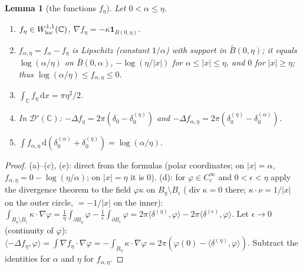 \documentclass[11pt]{article}
\newtheorem{lemma}[theorem]{Lemma}
\theoremstyle{definition}
\theoremstyle{remark}
\newcommand{\C}{\mathbb C}
\newcommand{\dd}{\,\mathrm d}
\DeclareMathOperator{\Div}{div}
\begin{document}
\begin{lemma}[the functions $f_\eta$]\label{lem:f}
Let $0<\alpha\le\eta$.
\begin{enumerate}[label=(\alph*)]
\item $f_\eta\in W^{1,1}_{\rm loc}(\C)$, $\nabla f_\eta=-\kappa\mathbf 1_{B(0,\eta)}$.
\item $f_{\alpha,\eta}=f_\alpha-f_\eta$ is Lipschitz (constant $1/\alpha$) with support in $\bar B(0,\eta)$; it equals
$\log(\alpha/\eta)$ on $\bar B(0,\alpha)$, $-\log(\eta/|x|)$ for $\alpha\le|x|\le\eta$, and $0$ for $|x|\ge\eta$; thus
$\log(\alpha/\eta)\le f_{\alpha,\eta}\le0$.
\item $\int_{\C}f_\eta\dd x=\pi\eta^2/2$.
\item In $\mathcal D'(\C)$: $-\Delta f_\eta=2\pi(\delta_0-\delta_0^{(\eta)})$ and $-\Delta f_{\alpha,\eta}=2\pi(\delta_0^{(\eta)}-\delta_0^{(\alpha)})$.
\item $\int f_{\alpha,\eta}\dd(\delta_0^{(\alpha)}+\delta_0^{(\eta)})=\log(\alpha/\eta)$.
\end{enumerate}
\end{lemma}
\begin{proof}
(a)--(c), (e): direct from the formulas (polar coordinates; on $|x|=\alpha$, $f_{\alpha,\eta}=0-\log(\eta/\alpha)$; on $|x|=\eta$ it is $0$).
(d): for $\varphi\in C^\infty_c$ and $0<\epsilon<\eta$ apply the divergence theorem to the field $\varphi\kappa$ on
$B_\eta\setminus B_\epsilon$ ($\Div\kappa=0$ there; $\kappa\cdot\nu=1/|x|$ on the outer circle, $=-1/|x|$ on the inner):
$\int_{B_\eta\setminus B_\epsilon}\kappa\cdot\nabla\varphi=\frac1\eta\int_{\partial B_\eta}\varphi-\frac1\epsilon\int_{\partial B_\epsilon}\varphi
=2\pi\langle\delta^{(\eta)},\varphi\rangle-2\pi\langle\delta^{(\epsilon)},\varphi\rangle$.  Let $\epsilon\to0$ (continuity of $\varphi$):
$\langle-\Delta f_\eta,\varphi\rangle=\int\nabla f_\eta\cdot\nabla\varphi=-\int_{B_\eta}\kappa\cdot\nabla\varphi=2\pi(\varphi(0)-\langle\delta^{(\eta)},\varphi\rangle)$.
Subtract the identities for $\alpha$ and $\eta$ for $f_{\alpha,\eta}$.
\end{proof}
\end{document}
